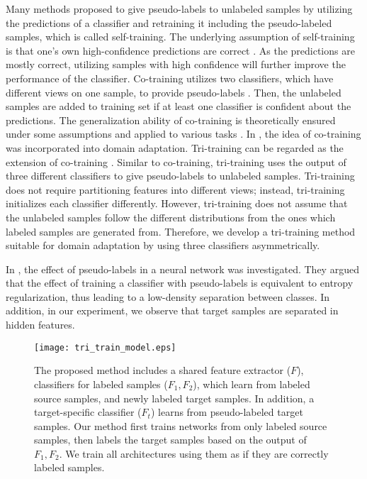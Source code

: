 \documentclass{article}
\begin{document}
Many methods proposed to give pseudo-labels to unlabeled samples by utilizing the predictions of a classifier and retraining it including the pseudo-labeled samples, which is called self-training. The underlying assumption of self-training is that one's own high-confidence predictions are correct \cite{zhu2005semi}. As the predictions are mostly correct, utilizing samples with high confidence will further improve the performance of the classifier. Co-training utilizes two classifiers, which have different views on one sample, to provide pseudo-labels \cite{blum1998combining,tanha2011ensemble}. Then, the unlabeled samples are added to training set if at least one classifier is confident about the predictions. The generalization ability of co-training is theoretically ensured \cite{balcan2004co,dasgupta2001pac} under some assumptions and applied to various tasks \cite{wan2009co,levin2003unsupervised}. In \cite{coda}, the idea of co-training was incorporated into domain adaptation. Tri-training can be regarded as the extension of co-training \cite{zhou2005tri}. Similar to co-training, tri-training uses the output of three different classifiers to give pseudo-labels to unlabeled samples. Tri-training does not require partitioning features into different views; instead, tri-training initializes each classifier differently. However, tri-training does not assume that the unlabeled samples follow the different distributions from the ones which labeled samples are generated from. Therefore, we develop a tri-training method suitable for domain adaptation by using three classifiers asymmetrically. 

In \cite{lee2013pseudo}, the effect of pseudo-labels in a neural network was investigated. They argued that the effect of training a classifier with pseudo-labels is equivalent to entropy regularization, thus leading to a low-density separation between classes. In addition, in our experiment, we observe that target samples are separated in hidden features.

\begin{figure}[t]
  \begin{center}
   \texttt{[image: tri\_train\_model.eps]}
  \end{center}
  \caption{The proposed method includes a shared feature extractor ($F$), classifiers for labeled samples ($F_1,F_2$), which learn from labeled source samples, and newly labeled target samples. In addition, a target-specific classifier ($F_t$) learns from pseudo-labeled target samples. Our method first trains networks from only labeled source samples, then labels the target samples based on the output of $F_1,F_2$. We train all architectures using them as if they are correctly labeled samples.}
  \label{fig:propose}
  \vspace{-2mm}
\end{figure}
\vspace{-3mm}
\end{document}
